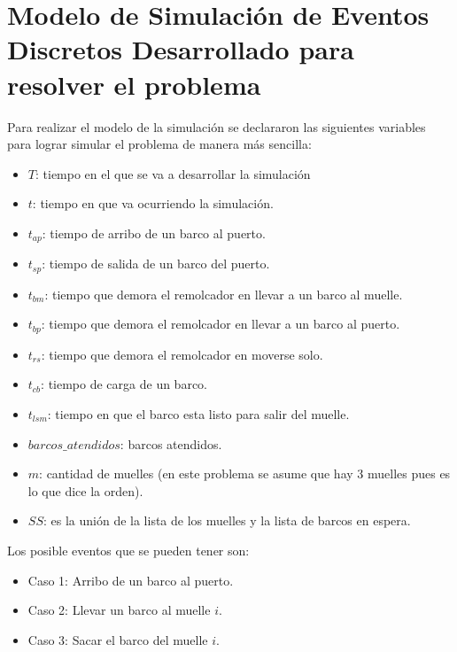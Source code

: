 \documentclass[a4paper,10pt]{article}
\begin{document}
 \section*{Modelo de Simulación de Eventos Discretos Desarrollado para resolver el problema}

 Para realizar el modelo de la simulación se declararon las siguientes variables para lograr simular el problema de manera más sencilla:

\begin{itemize}
  \item $T$: tiempo en el que se va a desarrollar la simulación
  \item $t$: tiempo en que va ocurriendo la simulación.
  \item $t_{ap}$: tiempo de arribo de un barco al puerto.
  \item $t_{sp}$: tiempo de salida de un barco del puerto.
  \item $t_{bm}$: tiempo que demora el remolcador en llevar a un barco al muelle.
  \item $t_{bp}$: tiempo que demora el remolcador en llevar a un barco al puerto.
  \item $t_{rs}$: tiempo que demora el remolcador en moverse solo.
  \item $t_{cb}$: tiempo de carga de un barco.
  \item $t_{lsm}$: tiempo en que el barco esta listo para salir del muelle.\\
  
  
  \item $barcos\_ atendidos$: barcos atendidos.
  \item $m$: cantidad de muelles (en este problema se asume que hay 3 muelles pues es lo que dice la orden).
  \item $SS$: es la unión de la lista de los muelles y la lista de barcos en espera. \\
\end{itemize}

 Los posible eventos que se pueden tener son:
\begin{itemize}
  \item Caso 1: Arribo de un barco al puerto.
  \item Caso 2: Llevar un barco al muelle $i$.
  \item Caso 3: Sacar el barco del muelle $i$.
\end{itemize}
\end{document}
